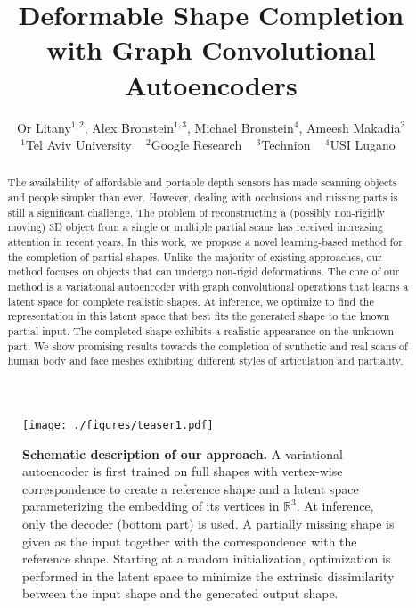 \documentclass[10pt,twocolumn,letterpaper]{article}
\begin{document}
\title{Deformable Shape Completion with Graph Convolutional Autoencoders}

\author{Or Litany$^{1,2}$,
        Alex Bronstein$^{1,3}$,
        Michael Bronstein$^{4}$,
        Ameesh Makadia$^{2}$
		\\
		$^1$Tel Aviv University \mbox{   }
		$^2$Google Research \mbox{   }
        $^3$Technion \mbox{   }
        $^4$USI Lugano\mbox{   }
		}



\maketitle


\begin{abstract}
   The availability of affordable and portable depth sensors has made scanning objects and people simpler than ever. However, dealing with occlusions and missing parts is still a significant challenge. The problem of reconstructing a (possibly non-rigidly moving) 3D object from a single or multiple partial scans has received increasing attention in recent years. In this work, we propose a novel learning-based method for the completion of partial shapes. Unlike the majority of existing approaches, our method focuses on objects that can undergo non-rigid deformations. The core of our method is a variational autoencoder with graph convolutional operations that learns a latent space for complete realistic shapes. At inference, we optimize to find the representation in this latent space that best fits the generated shape to the known partial input. The completed shape exhibits a realistic appearance on the unknown part. We show promising results towards the completion of synthetic and real scans of human body and face meshes exhibiting different styles of articulation and partiality.
\end{abstract}


\begin{figure*}
\centering
\texttt{[image: ./figures/teaser1.pdf]}
\caption{\textbf{Schematic description of our approach.} A variational autoencoder is first trained on full shapes with vertex-wise correspondence to create a reference shape and a latent space parameterizing the embedding of its vertices in $\mathbb{R}^3$. At inference, only the decoder (bottom part) is used. A partially missing shape is given as the input together with the correspondence with the reference shape. Starting at a random initialization, optimization is performed in the latent space to minimize the extrinsic dissimilarity between the input shape and the generated output shape.  } 
\label{fig:teaser}
\end{figure*}
\end{document}
